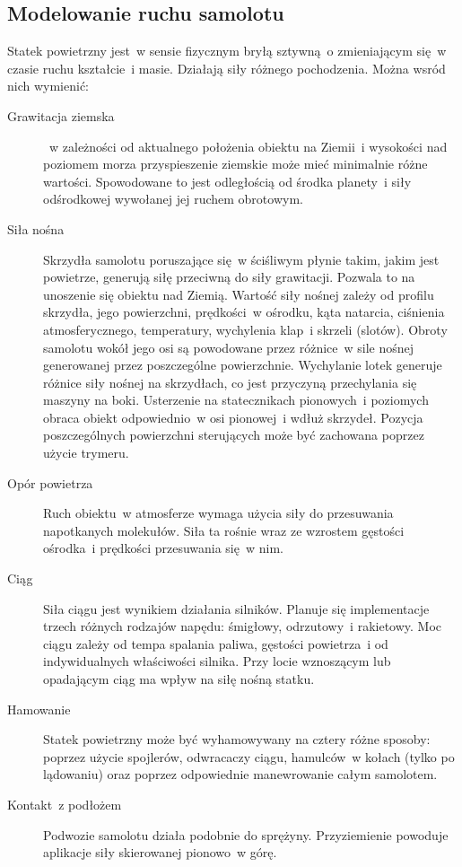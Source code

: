 \documentclass{mwrep}
\begin{document}
\subsection{Modelowanie ruchu samolotu}

Statek powietrzny jest~w sensie fizycznym bryłą sztywną~o zmieniającym się~w czasie ruchu kształcie~i masie. Działają siły różnego pochodzenia. Można wsród nich wymienić:
\begin{description}
\item[Grawitacja ziemska]~w zależności od aktualnego położenia obiektu na Ziemii~i wysokości nad poziomem morza przyspieszenie ziemskie może mieć minimalnie różne wartości. Spowodowane to jest odległością od środka planety~i siły odśrodkowej wywołanej jej ruchem obrotowym.
\item[Siła nośna] Skrzydła samolotu poruszające się~w ściśliwym płynie takim, jakim jest powietrze, generują siłę przeciwną do siły grawitacji. Pozwala to na unoszenie się obiektu nad Ziemią. Wartość siły nośnej zależy od profilu skrzydła, jego powierzchni, prędkości~w ośrodku, kąta natarcia, ciśnienia atmosferycznego, temperatury, wychylenia klap~i skrzeli (slotów). Obroty samolotu wokół jego osi są powodowane przez różnice~w sile nośnej generowanej przez poszczególne powierzchnie. Wychylanie lotek generuje różnice siły nośnej na skrzydłach, co jest przyczyną przechylania się maszyny na boki. Usterzenie na statecznikach pionowych~i poziomych obraca obiekt odpowiednio~w osi pionowej~i wdłuż skrzydeł. Pozycja poszczególnych powierzchni sterujących może być zachowana poprzez użycie trymeru.
\item[Opór powietrza] Ruch obiektu~w atmosferze wymaga użycia siły do przesuwania napotkanych molekułów. Siła ta rośnie wraz ze wzrostem gęstości ośrodka~i prędkości przesuwania się~w nim.
\item[Ciąg] Siła ciągu jest wynikiem działania silników. Planuje się implementacje trzech różnych rodzajów napędu: śmigłowy, odrzutowy~i rakietowy. Moc ciągu zależy od tempa spalania paliwa, gęstości powietrza~i od indywidualnych właściwości silnika. Przy locie wznoszącym lub opadającym ciąg ma wpływ na siłę nośną statku.
\item[Hamowanie] Statek powietrzny może być wyhamowywany na cztery różne sposoby: poprzez użycie spojlerów, odwracaczy ciągu, hamulców~w kołach (tylko po lądowaniu) oraz poprzez odpowiednie manewrowanie całym samolotem.
\item[Kontakt~z podłożem] Podwozie samolotu działa podobnie do sprężyny. Przyziemienie powoduje aplikacje siły skierowanej pionowo~w górę.
\end{description}
\end{document}
